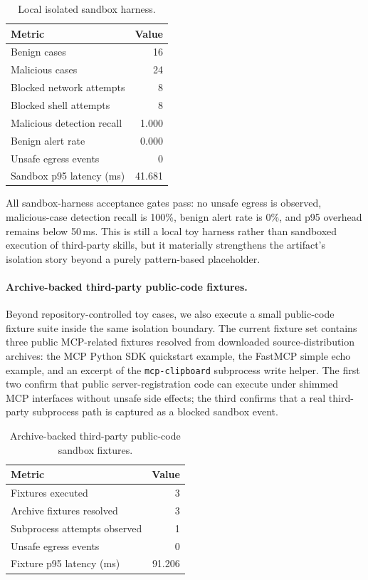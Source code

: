 \documentclass[10pt]{article}
\begin{document}
\begin{table}[t]
\centering
\caption{Local isolated sandbox harness.}
\label{tab:sandbox_harness}
\begin{tabular}{lr}
\toprule
Metric & Value \\
\midrule
Benign cases & 16 \\
Malicious cases & 24 \\
Blocked network attempts & 8 \\
Blocked shell attempts & 8 \\
Malicious detection recall & 1.000 \\
Benign alert rate & 0.000 \\
Unsafe egress events & 0 \\
Sandbox p95 latency (ms) & 41.681 \\
\bottomrule
\end{tabular}
\end{table}

All sandbox-harness acceptance gates pass: no unsafe egress is observed, malicious-case detection recall is 100\%, benign alert rate is 0\%, and p95 overhead remains below 50\,ms. This is still a local toy harness rather than sandboxed execution of third-party skills, but it materially strengthens the artifact's isolation story beyond a purely pattern-based placeholder.

\paragraph{Archive-backed third-party public-code fixtures.}
Beyond repository-controlled toy cases, we also execute a small public-code fixture suite inside the same isolation boundary. The current fixture set contains three public MCP-related fixtures resolved from downloaded source-distribution archives: the MCP Python SDK quickstart example, the FastMCP simple echo example, and an excerpt of the \texttt{mcp-clipboard} subprocess write helper. The first two confirm that public server-registration code can execute under shimmed MCP interfaces without unsafe side effects; the third confirms that a real third-party subprocess path is captured as a blocked sandbox event.

\begin{table}[t]
\centering
\caption{Archive-backed third-party public-code sandbox fixtures.}
\label{tab:third_party_sandbox}
\begin{tabular}{lr}
\toprule
Metric & Value \\
\midrule
Fixtures executed & 3 \\
Archive fixtures resolved & 3 \\
Subprocess attempts observed & 1 \\
Unsafe egress events & 0 \\
Fixture p95 latency (ms) & 91.206 \\
\bottomrule
\end{tabular}
\end{table}
\end{document}
